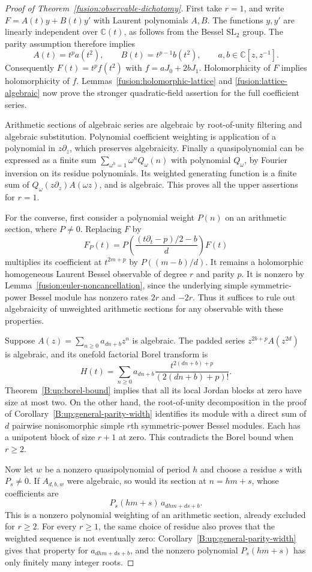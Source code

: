 \documentclass[11pt,a4paper]{article}
\theoremstyle{definition}
\theoremstyle{remark}
\numberwithin{equation}{section}
\begin{document}
\begin{proof}[Proof of Theorem~\ref{fusion:observable-dichotomy}]
First take $r=1$, and write $F=A(t)y+B(t)y'$ with Laurent
polynomials $A,B$.  The functions $y,y'$ are linearly
independent over $\mathbb C(t)$, as follows from the Bessel
$\mathrm{SL}_2$ group.  The parity assumption therefore
implies
\[
 A(t)=t^pa(t^2),\qquad B(t)=t^{p-1}b(t^2),
 \qquad a,b\in\mathbb C[z,z^{-1}].
\]
Consequently
$F(t)=t^p f(t^2)$ with $f=aJ_0+2bJ_1$.
Holomorphicity of $F$ implies holomorphicity of $f$.
Lemmas~\ref{fusion:holomorphic-lattice} and
\ref{fusion:lattice-algebraic} now prove the stronger
quadratic-field assertion for the full coefficient series.

Arithmetic sections of algebraic series are algebraic by
root-of-unity filtering and algebraic substitution.
Polynomial coefficient weighting is application of a
polynomial in $z\partial_z$, which preserves algebraicity.
Finally a quasipolynomial can be expressed as a finite sum
$\sum_{\omega^h=1}\omega^n Q_\omega(n)$ with polynomial
$Q_\omega$, by Fourier inversion on its residue polynomials.
Its weighted generating function is a finite sum of
$Q_\omega(z\partial_z)A(\omega z)$, and is algebraic.
This proves all the upper assertions for $r=1$.

For the converse, first consider a polynomial weight $P(n)$
on an arithmetic section, where $P\ne0$.  Replacing $F$ by
\[
 F_P(t)=P\left(\frac{(t\partial_t-p)/2-b}{d}\right)F(t)
\]
multiplies its coefficient at $t^{2m+p}$ by
$P((m-b)/d)$.  It remains a holomorphic homogeneous Laurent
Bessel observable of degree $r$ and parity $p$.  It is
nonzero by Lemma~\ref{fusion:euler-noncancellation}, since
the underlying simple symmetric-power Bessel module has
nonzero rates $2r$ and $-2r$.
Thus it suffices to rule out algebraicity of unweighted
arithmetic sections for any observable with these properties.

Suppose $A(z)=\sum_{n\ge0}a_{dn+b}z^n$ is algebraic.
The padded series $z^{2b+p}A(z^{2d})$ is algebraic, and its
onefold factorial Borel transform is
\[
 H(t)=\sum_{n\ge0}a_{dn+b}
                 \frac{t^{2(dn+b)+p}}{(2(dn+b)+p)!}.
\]
Theorem~\ref{B:up:borel-bound} implies that all its local
Jordan blocks at zero have size at most two.  On the other
hand, the root-of-unity decomposition in the proof of
Corollary~\ref{B:up:general-parity-width} identifies its
module with a direct sum of $d$ pairwise nonisomorphic
simple $r$th symmetric-power Bessel modules.  Each has a
unipotent block of size $r+1$ at zero.  This contradicts
the Borel bound when $r\ge2$.

Now let $w$ be a nonzero quasipolynomial of period $h$ and
choose a residue $s$ with $P_s\ne0$.  If $A_{d,b,w}$ were
algebraic, so would its section at $n=hm+s$, whose coefficients
are
\[
 P_s(hm+s)\,a_{dhm+ds+b}.
\]
This is a nonzero polynomial weighting of an arithmetic
section, already excluded for $r\ge2$.  For every $r\ge1$, the same choice of
residue also proves that the weighted sequence is not
eventually zero: Corollary~\ref{B:up:general-parity-width}
gives that property for $a_{dhm+ds+b}$, and the nonzero
polynomial $P_s(hm+s)$ has only finitely many integer roots.
\end{proof}
\end{document}
